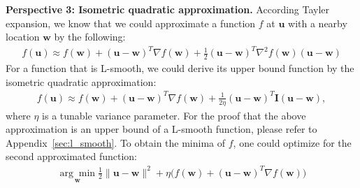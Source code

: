 \documentclass[11pt]{article}
\newcommand{\bw}{\boldsymbol{w}}
\newcommand{\bu}{\boldsymbol{u}}
\begin{document}

\textbf{Perspective 3: Isometric quadratic approximation.}
According Tayler expansion, we know that we could approximate a function $f$ at $\bu$ with a nearby location $\bw$ by the following:
%
\begin{equation*}
\begin{split}
f(\bu) \approx f(\bw) + (\bu-\bw)^T \nabla f(\bw) + \frac{1}{2} (\bu-\bw)^T \nabla^2 f(\bw) (\bu-\bw)
\end{split}
\end{equation*}
%
For a function that is L-smooth, we could derive its upper bound function by the isometric quadratic approximation:
\begin{equation*}
\begin{split}
f(\bu) \approx f(\bw) + (\bu-\bw)^T \nabla f(\bw) + \frac{1}{2\eta} (\bu-\bw)^T \boldsymbol{I} (\bu-\bw),
\end{split}
\end{equation*}
where $\eta$ is a tunable variance parameter. For the proof that the above approximation is an upper bound of a L-smooth function, please refer to Appendix~\ref{sec:l_smooth}.
%
%
To obtain the minima of $f$, one could optimize for the second approximated function:
\begin{equation*}
\begin{split}
\underset{\bw}{\arg\min} \frac{1}{2} \|\bu-\bw\|^2 +
\eta \Big( f(\bw) + (\bu-\bw)^T \nabla f(\bw) \Big)
\end{split}
\end{equation*}
\end{document}
